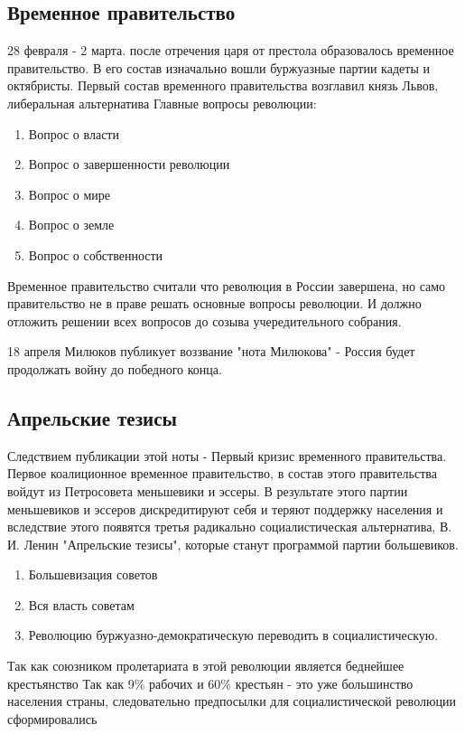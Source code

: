 \documentclass[a4paper]{article}
\begin{document}
\subsection{Временное правительство} 28 февраля - 2 марта. после отречения царя от престола образовалось временное правительство. В его состав изначально вошли буржуазные партии кадеты и октябристы. Первый состав временного правительства возглавил князь Львов, либеральная альтернатива
Главные вопросы революции:
\begin{enumerate}
    \item Вопрос о власти
    \item Вопрос о завершенности революции
    \item Вопрос о мире
    \item Вопрос о земле
    \item Вопрос о собственности
\end{enumerate}

Временное правительство считали что революция в России завершена, но само правительство не в праве решать основные вопросы революции.
И должно отложить решении всех вопросов до созыва учередительного собрания.

18 апреля Милюков публикует воззвание "нота Милюкова" - Россия будет продолжать войну до победного конца.

\subsection{Апрельские тезисы}
Следствием публикации этой ноты - Первый кризис временного правительства.
Первое коалиционное временное правительство, в состав этого правительства войдут из Петросовета меньшевики и эссеры.
В результате этого партии меньшевиков и эссеров дискредитируют себя и теряют поддержку населения
и вследствие этого появятся третья радикально социалистическая альтернатива, В. И. Ленин "Апрельские тезисы", которые станут программой партии большевиков.
\begin{enumerate}
    \item Большевизация советов
    \item Вся власть советам
    \item Революцию буржуазно-демократическую переводить в социалистическую.
\end{enumerate}

Так как союзником пролетариата в этой революции является беднейшее крестьянство
Так как 9\% рабочих и 60\% крестьян - это уже большинство населения страны, следовательно предпосылки для социалистической революции сформировались
\end{document}

